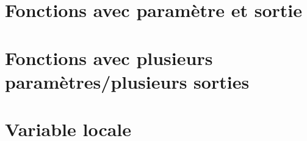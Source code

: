 \documentclass[11pt,class=report,crop=false]{standalone}
\begin{document}



\newpage

\section*{Fonctions avec paramètre et sortie}


\newpage

\section*{Fonctions avec plusieurs paramètres/plusieurs sorties}


\newpage

\section*{Variable locale}


\end{document}
